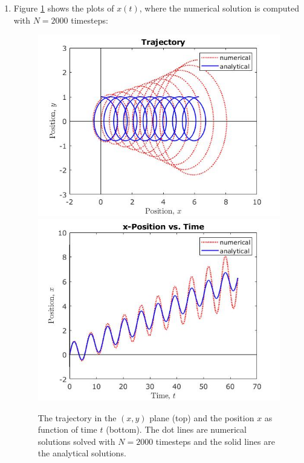 \documentclass{article}
\begin{document}
\begin{enumerate}
\begin{enumerate}
\item
Figure \ref{problem 2.1} shows the plots of $x(t)$, where the numerical solution is computed with $N=2000$ timesteps:
\begin{figure}[h]
\centering
\vbox{
\includegraphics[scale=0.6]{problem2/trajectory_timestep_2000.jpg}
\includegraphics[scale=0.6]{problem2/xposition_timestep_2000.jpg}
}
\caption{The trajectory in the $(x, y)$ plane (top) and the position $x$ as function of time $t$ (bottom). The dot lines are numerical solutions solved with $N=2000$ timesteps and the solid lines are the analytical solutions.}
\label{problem 2.1}
\end{figure}


\end{enumerate}
\end{enumerate}
\end{document}
